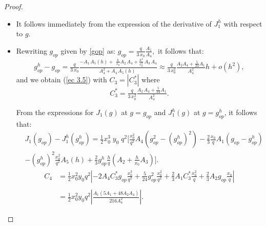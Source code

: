 \documentclass[11pt]{article}
\begin{document}
    
  \begin{proof} $ $
    

    \begin{itemize}
    \item[(a)] { It follows immediately from the expression of the derivative of $J^h_1$ with respect to $g$.}
    
\item[(b)] Rewriting $g_{op}$ given by \eqref{gop} as:
    	  $g_{op}= \tfrac{q}{3\,x_0} \tfrac{A_1 }{A_4},$
    	  it follows that:
    	  \[   {g^h_{op}}-g_{op} = \tfrac{q}{3\,x_0}  \tfrac {-A_1\,A_5(h)+\,\,\tfrac{h}{x_0} A_2\, A_4 + \tfrac{h^2}{x_0^2}\,A_3\,A_4   }{A_4^2 + A_4 \,A_5(h)\,\,} \approx\tfrac{q}{3\,x_0^2} \tfrac{  A_2A_4+\tfrac{5}{24}A_1 }{ A_4^2} h+o(h^2),\]
    and we obtain (\ref{ec 3.5}) with $C_3=|C_3^*|$ where \begin{equation}\label{C3*}
    C_3^*=\tfrac{q}{3\,x_0^2} \tfrac{ A_2 \,A_4+ \tfrac{5}{24}A_1 }{A_4^2}. 
    \end{equation}
  
   From the expressions for $J_1(g)$ at $g=g_{op}$ and ${J^h_{1}(g)}$ at ${ g= g^h_{op}}$, it follows that:
    \[\begin{array}{ll}
&    J_1(g_{op})- {J^h_{1}(g^h_{op})} =\tfrac{1}{2}x_0^3\;y_0\; q^2 \bigg[\tfrac{x_0^2}{q^2}A_4(g_{op} ^2-({g^{h}_{op}})^2)  -\tfrac{2}{3}\tfrac{x_0}{q} A_1 (g_{op}-{g^h_{op}})\\
    & -({g^h_{op}})^2 \tfrac{x_0^2}{q^2}A_5(h)+\tfrac{2}{3} {g^h_{op}} \tfrac{h}{q} \left( A_2+\tfrac{h}{x_0}A_3\right)\bigg]. 
\end{array}\]
   $$\begin{array}{ll}
   C_4 &= \tfrac{1}{2} x_0^2 y_0 q^2  \left|-2A_4 C_3^* g_{op}\tfrac{x_0^3}{q^2} +\tfrac{5}{24} g_{op}^2\tfrac{x_0^2}{ q^2}+\tfrac{2}{3}A_1 C_3^* \tfrac{x_0^2}{q}+\tfrac{2}{3} A_2 g_{op} \tfrac{x_0}{q} \right| \\
   \\
   &= \tfrac{1}{2} x_0^2 y_0 q^2  \left|\tfrac{A_1(5A_1+48 A_2A_4)}{216 A_4^2}\right|.
   \end{array}$$

    \end{itemize}   
   \end{proof}
     
\end{document}
